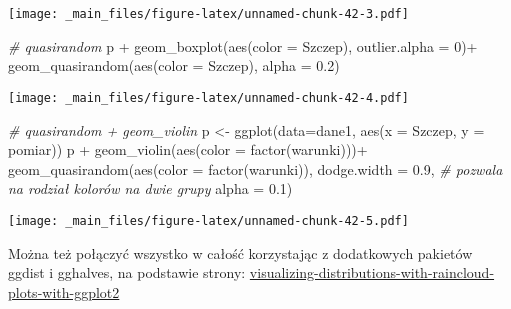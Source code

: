 \documentclass[
]{book}
\newenvironment{Shaded}{\begin{snugshade}}{\end{snugshade}}
\newcommand{\AttributeTok}[1]{\textcolor[rgb]{0.77,0.63,0.00}{#1}}
\newcommand{\CommentTok}[1]{\textcolor[rgb]{0.56,0.35,0.01}{\textit{#1}}}
\newcommand{\DecValTok}[1]{\textcolor[rgb]{0.00,0.00,0.81}{#1}}
\newcommand{\FloatTok}[1]{\textcolor[rgb]{0.00,0.00,0.81}{#1}}
\newcommand{\FunctionTok}[1]{\textcolor[rgb]{0.00,0.00,0.00}{#1}}
\newcommand{\NormalTok}[1]{#1}
\newcommand{\OtherTok}[1]{\textcolor[rgb]{0.56,0.35,0.01}{#1}}
\newcommand{\SpecialCharTok}[1]{\textcolor[rgb]{0.00,0.00,0.00}{#1}}
\begin{document}
\texttt{[image: \_main\_files/figure-latex/unnamed-chunk-42-3.pdf]}

\begin{Shaded}
\begin{Highlighting}[]
\CommentTok{\# quasirandom}
\NormalTok{p }\SpecialCharTok{+} \FunctionTok{geom\_boxplot}\NormalTok{(}\FunctionTok{aes}\NormalTok{(}\AttributeTok{color =}\NormalTok{ Szczep), }\AttributeTok{outlier.alpha =} \DecValTok{0}\NormalTok{)}\SpecialCharTok{+}
  \FunctionTok{geom\_quasirandom}\NormalTok{(}\FunctionTok{aes}\NormalTok{(}\AttributeTok{color =}\NormalTok{ Szczep), }\AttributeTok{alpha =} \FloatTok{0.2}\NormalTok{)}
\end{Highlighting}
\end{Shaded}

\texttt{[image: \_main\_files/figure-latex/unnamed-chunk-42-4.pdf]}

\begin{Shaded}
\begin{Highlighting}[]
\CommentTok{\# quasirandom + geom\_violin}
\NormalTok{p }\OtherTok{\textless{}{-}} \FunctionTok{ggplot}\NormalTok{(}\AttributeTok{data=}\NormalTok{dane1, }\FunctionTok{aes}\NormalTok{(}\AttributeTok{x =}\NormalTok{ Szczep, }\AttributeTok{y =}\NormalTok{ pomiar))}
\NormalTok{p }\SpecialCharTok{+} \FunctionTok{geom\_violin}\NormalTok{(}\FunctionTok{aes}\NormalTok{(}\AttributeTok{color =} \FunctionTok{factor}\NormalTok{(warunki)))}\SpecialCharTok{+}
  \FunctionTok{geom\_quasirandom}\NormalTok{(}\FunctionTok{aes}\NormalTok{(}\AttributeTok{color =} \FunctionTok{factor}\NormalTok{(warunki)), }
                   \AttributeTok{dodge.width =} \FloatTok{0.9}\NormalTok{, }\CommentTok{\# pozwala na rodział kolorów na dwie grupy}
                   \AttributeTok{alpha =} \FloatTok{0.1}\NormalTok{)}
\end{Highlighting}
\end{Shaded}

\texttt{[image: \_main\_files/figure-latex/unnamed-chunk-42-5.pdf]}

Można też połączyć wszystko w całość korzystając z dodatkowych pakietów ggdist i gghalves, na podstawie strony: \href{https://www.cedricscherer.com/2021/06/06/visualizing-distributions-with-raincloud-plots-with-ggplot2/}{visualizing-distributions-with-raincloud-plots-with-ggplot2}
\end{document}
